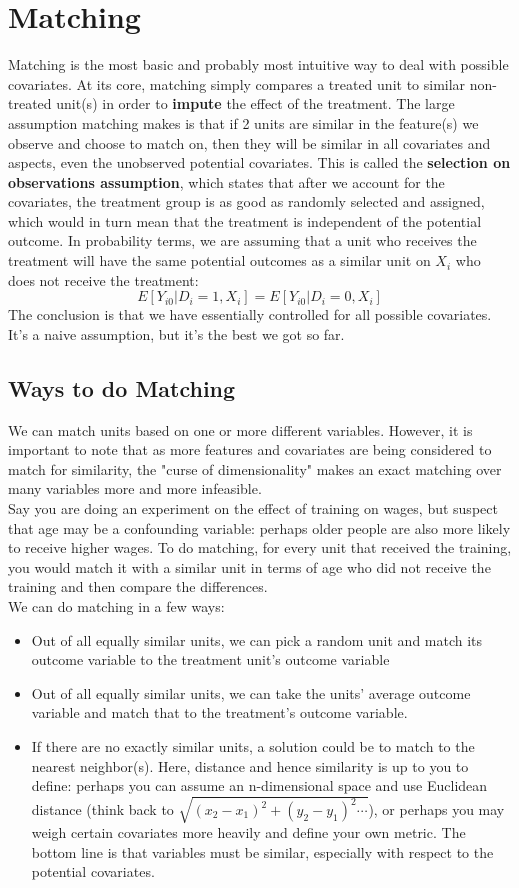 \documentclass{article}
\begin{document}
\section{Matching}
Matching is the most basic and probably most intuitive way to deal with possible covariates.
At its core, matching simply compares a treated unit to similar non-treated unit(s) in order to \textbf{impute} the effect of the treatment.
The large assumption matching makes is that if 2 units are similar in the feature(s) we observe and choose to match on, then they will be similar in all covariates and aspects, even the unobserved potential covariates.
This is called the \textbf{selection on observations assumption}, which states that after we account for the covariates, the treatment group is as good as randomly selected and assigned, which would in turn mean that the treatment is independent of the potential outcome.
In probability terms, we are assuming that a unit who receives the treatment will have the same potential outcomes as a similar unit on $X_i$ who does not receive the treatment:
$$E[Y_{i0} | D_i = 1, X_i] = E[Y_{i0} | D_i = 0, X_i]$$
The conclusion is that we have essentially controlled for all possible covariates. 
It's a naive assumption, but it's the best we got so far. 

\subsection{Ways to do Matching}
We can match units based on one or more different variables.
However, it is important to note that as more features and covariates are being considered to match for similarity, the "curse of dimensionality" makes an exact matching over many variables more and more infeasible.
\\
Say you are doing an experiment on the effect of training on wages, but suspect that age may be a confounding variable: perhaps older people are also more likely to receive higher wages. 
To do matching, for every unit that received the training, you would match it with a similar unit in terms of age who did not receive the training and then compare the differences. 
\\
We can do matching in a few ways:
\begin{itemize}
	\item Out of all equally similar units, we can pick a random unit and match its outcome variable to the treatment unit's outcome variable
	\item Out of all equally similar units, we can take the units' average outcome variable and match that to the treatment's outcome variable.
	\item If there are no exactly similar units, a solution could be to match to the nearest neighbor(s).
	Here, distance and hence similarity is up to you to define: perhaps you can assume an n-dimensional space and use Euclidean distance (think back to $\sqrt{(x_2-x_1)^2 + (y_2-y_1)^2 \cdots}$), or perhaps you may weigh certain covariates more heavily and define your own metric. 
	The bottom line is that variables must be similar, especially with respect to the potential covariates.
\end{itemize}
\end{document}
